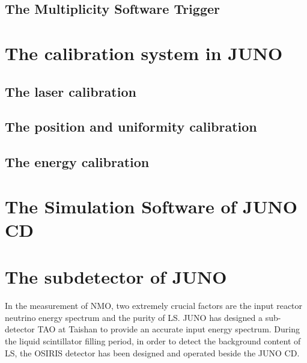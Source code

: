 \subsection{The Multiplicity Software Trigger}

\section{The calibration system in JUNO}
\label{sec:juno_calibration}
\subsection{The laser calibration}
\subsection{The position and uniformity calibration}
\subsection{The energy calibration}

\section{The Simulation Software of JUNO CD}
\label{sec:juno_simulation}
\section{The subdetector of JUNO}
\label{sec:juno_subdetector}
In the measurement of NMO, two extremely crucial factors are the input reactor neutrino energy spectrum and the purity of LS. JUNO has designed a sub-detector TAO at Taishan to provide an accurate input energy spectrum. During the liquid scintillator filling period, in order to detect the background content of LS, the OSIRIS detector has been designed and operated beside the JUNO CD.

